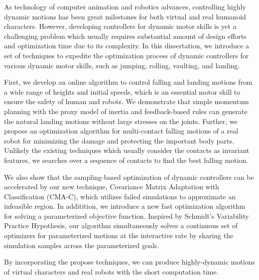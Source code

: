 \begin{summary}
  As technology of computer animation and robotics advances,
  controlling highly dynamic motions
  has been great milestones for both virtual and real humanoid characters.
  However, developing controllers for dynamic motor skills is yet a challenging
  problem which usually requires substantial amount of design efforts and
  optimization time due to its complexity.
  In this dissertation, we introduce a set of techniques to expedite
  the optimization process of dynamic controllers for various dynamic motor 
  skills, such as jumping, rolling, vaulting, and landing.

  First, we develop an online algorithm to control falling and landing motions 
  from a wide range of heights and initial speeds,
  which is an essential motor skill to ensure the safety of human and robots.
  We demonstrate that simple momentum planning with the proxy model of inertia 
  and feedback-based rules can generate the natural landing motions
  without large stresses on the joints.
  Further, we propose an optimization algorithm for multi-contact falling
  motions of a real robot for minimizing the damage and protecting the 
  important body parts.
  Unlikely the existing techniques which usually consider the contacts as
  invariant features, we searches over a sequence of contacts to find
  the best falling motion.

  We also show that the sampling-based optimization of dynamic controllers
  can be accelerated by our new technique,
  Covariance Matrix Adaptation with Classification (CMA-C), 
  which utilizes failed simulations to approximate an infeasible region.
  In additition, we introduce a new fast optimization algorithm 
  for solving a parameterized objective function.
  Inspired by Schmidt's Variability Practice Hypothesis, 
  our algorithm simultaneously solves a continuous set of optimizers 
  for parameterized motions at the interactive rate 
  by sharing the simulation samples across the parameterized goals.

  By incorporating the propose techniques, we can produce highly-dynamic motions 
  of virtual characters and real robots with the short computation time.


\end{summary}
